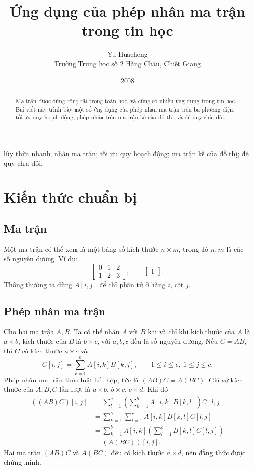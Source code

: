 \documentclass[11pt]{article}
\title{Ứng dụng của phép nhân ma trận trong tin học}
\author{Yu Huacheng\\Trường Trung học số 2 Hàng Châu, Chiết Giang}
\date{2008}
\begin{document}
\maketitle


\begin{abstract}
Ma trận được dùng rộng rãi trong toán học, và cũng có nhiều ứng dụng trong
tin học. Bài viết này trình bày một số ứng dụng của phép nhân ma trận trên ba
phương diện: tối ưu quy hoạch động, phép nhân trên ma trận kề của đồ thị, và
đệ quy chia đôi.
\end{abstract}

\noindent{} lũy thừa nhanh; nhân ma trận; tối ưu quy hoạch động;
ma trận kề của đồ thị; đệ quy chia đôi.

\tableofcontents

\section{Kiến thức chuẩn bị}

\subsection{Ma trận}

Một ma trận có thể xem là một bảng số kích thước \(n\times m\), trong đó
\(n,m\) là các số nguyên dương. Ví dụ:
\[
  \begin{bmatrix}
    0&1&2\\
    1&2&3
  \end{bmatrix},
  \qquad
  \begin{bmatrix}
    1
  \end{bmatrix}.
\]
Thông thường ta dùng \(A[i,j]\) để chỉ phần tử ở hàng \(i\), cột \(j\).

\subsection{Phép nhân ma trận}

Cho hai ma trận \(A,B\). Ta có thể nhân \(A\) với \(B\) khi và chỉ khi kích
thước của \(A\) là \(a\times b\), kích thước của \(B\) là \(b\times c\), với
\(a,b,c\) đều là số nguyên dương. Nếu \(C=AB\), thì \(C\) có kích thước
\(a\times c\) và
\[
  C[i,j]=\sum_{k=1}^{b} A[i,k]B[k,j],
  \qquad 1\le i\le a,\ 1\le j\le c.
\]
Phép nhân ma trận thỏa luật kết hợp, tức là \((AB)C=A(BC)\). Giả sử kích
thước của \(A,B,C\) lần lượt là \(a\times b\), \(b\times c\), \(c\times d\).
Khi đó
\[
\begin{aligned}
  ((AB)C)[i,j]
  &=\sum_{l=1}^{c}\left(\sum_{k=1}^{b}A[i,k]B[k,l]\right)C[l,j]\\
  &=\sum_{k=1}^{b}\sum_{l=1}^{c}A[i,k]B[k,l]C[l,j]\\
  &=\sum_{k=1}^{b}A[i,k]\left(\sum_{l=1}^{c}B[k,l]C[l,j]\right)\\
  &=(A(BC))[i,j].
\end{aligned}
\]
Hai ma trận \((AB)C\) và \(A(BC)\) đều có kích thước \(a\times d\), nên đẳng
thức được chứng minh.
\end{document}
